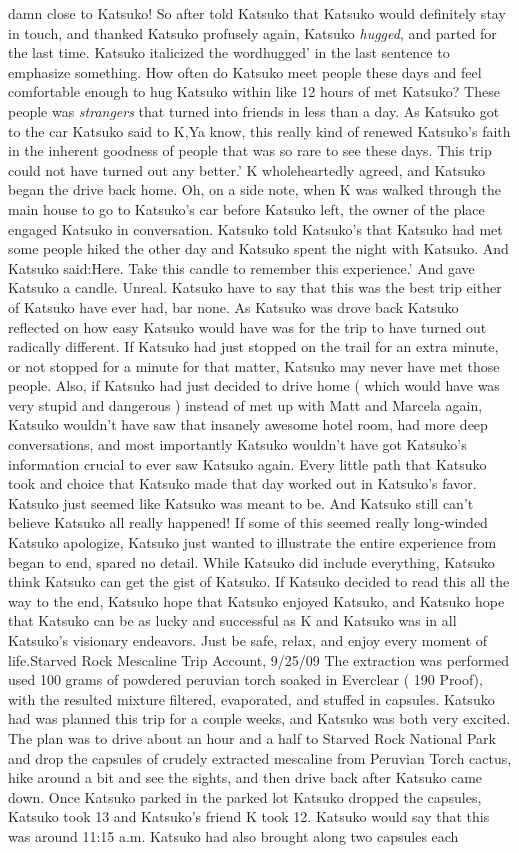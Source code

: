 \documentclass[12pt]{book}
\begin{document}
damn close to Katsuko! So after told Katsuko that Katsuko would definitely stay in touch, and thanked Katsuko profusely again, Katsuko \emph{hugged}, and parted for the last time. Katsuko italicized the wordhugged' in the last sentence to emphasize something. How often do Katsuko meet people these days and feel comfortable enough to hug Katsuko within like 12 hours of met Katsuko? These people was \emph{strangers} that turned into friends in less than a day. As Katsuko got to the car Katsuko said to K,Ya know, this really kind of renewed Katsuko's faith in the inherent goodness of people that was so rare to see these days. This trip could not have turned out any better.' K wholeheartedly agreed, and Katsuko began the drive back home. Oh, on a side note, when K was walked through the main house to go to Katsuko's car before Katsuko left, the owner of the place engaged Katsuko in conversation. Katsuko told Katsuko's that Katsuko had met some people hiked the other day and Katsuko spent the night with Katsuko. And Katsuko said:Here. Take this candle to remember this experience.' And gave Katsuko a candle. Unreal. Katsuko have to say that this was the best trip either of Katsuko have ever had, bar none. As Katsuko was drove back Katsuko reflected on how easy Katsuko would have was for the trip to have turned out radically different. If Katsuko had just stopped on the trail for an extra minute, or not stopped for a minute for that matter, Katsuko may never have met those people. Also, if Katsuko had just decided to drive home ( which would have was very stupid and dangerous ) instead of met up with Matt and Marcela again, Katsuko wouldn't have saw that insanely awesome hotel room, had more deep conversations, and most importantly Katsuko wouldn't have got Katsuko's information crucial to ever saw Katsuko again. Every little path that Katsuko took and choice that Katsuko made that day worked out in Katsuko's favor. Katsuko just seemed like Katsuko was meant to be. And Katsuko still can't believe Katsuko all really happened! If some of this seemed really long-winded Katsuko apologize, Katsuko just wanted to illustrate the entire experience from began to end, spared no detail. While Katsuko did include everything, Katsuko think Katsuko can get the gist of Katsuko. If Katsuko decided to read this all the way to the end, Katsuko hope that Katsuko enjoyed Katsuko, and Katsuko hope that Katsuko can be as lucky and successful as K and Katsuko was in all Katsuko's visionary endeavors. Just be safe, relax, and enjoy every moment of life.Starved Rock Mescaline Trip Account, 9/25/09 The extraction was performed used 100 grams of powdered peruvian torch soaked in Everclear ( 190 Proof), with the resulted mixture filtered, evaporated, and stuffed in capsules. Katsuko had was planned this trip for a couple weeks, and Katsuko was both very excited. The plan was to drive about an hour and a half to Starved Rock National Park and drop the capsules of crudely extracted mescaline from Peruvian Torch cactus, hike around a bit and see the sights, and then drive back after Katsuko came down. Once Katsuko parked in the parked lot Katsuko dropped the capsules, Katsuko took 13 and Katsuko's friend K took 12. Katsuko would say that this was around 11:15 a.m. Katsuko had also brought along two capsules each 
\end{document}
